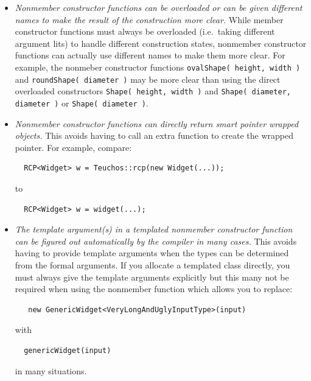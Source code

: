 \documentclass[pdf,ps2pdf,11pt]{SANDreport}
\begin{document}
\begin{itemize}

{}\item\textit{Nonmember constructor functions can be overloaded or can be
given different names to make the result of the construction more clear.}
While member constructor functions must always be overloaded (i.e.\ taking
different argument lits) to handle different construction states, nonmember
constructor functions can actually use different names to make them more
clear.  For example, the nonmeber constructor functions {}\texttt{ovalShape(
height, width )} and {}\texttt{roundShape( diameter )} may be more clear than
using the direct overloaded constructors {}\texttt{Shape( height, width )} and
{}\texttt{Shape( diameter, diameter )} or {}\texttt{Shape( diameter )}.

{}\item\textit{Nonmember constructor functions can directly return smart
pointer wrapped objects.}  This avoids having to call an extra function to
create the wrapped pointer.  For example, compare:

{\small\begin{verbatim}
  RCP<Widget> w = Teuchos::rcp(new Widget(...));
\end{verbatim}}

to

{\small\begin{verbatim}
  RCP<Widget> w = widget(...);
\end{verbatim}}

{}\item\textit{The template argument(s) in a templated nonmember constructor
function can be figured out automatically by the compiler in many cases.}
This avoids having to provide template arguments when the types can be
determined from the formal arguments.  If you allocate a templated class
directly, you must always give the template arguments explicitly but this many
not be required when using the nonmember function which allows you to replace:

{\small\begin{verbatim}
   new GenericWidget<VeryLongAndUglyInputType>(input)
\end{verbatim}}

with

{\small\begin{verbatim}
  genericWidget(input)
\end{verbatim}}

in many situations.


\end{itemize}
\end{document}

